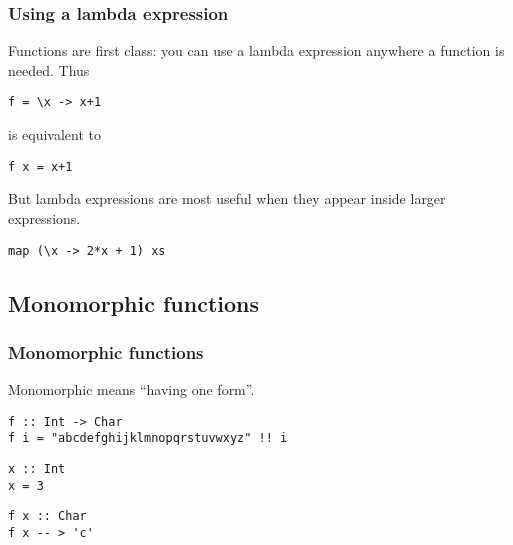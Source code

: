 \documentclass{beamer}
\begin{document}
\begin{frame}[fragile]
\frametitle{Using a lambda expression}

Functions are first class: you can use a lambda expression anywhere
a function is needed.  Thus

\begin{verbatim}
f = \x -> x+1
\end{verbatim}

is equivalent to

\begin{verbatim}
f x = x+1
\end{verbatim}

But lambda expressions are most useful when they appear inside
larger expressions.

\begin{verbatim}
map (\x -> 2*x + 1) xs
\end{verbatim}

\end{frame}

\subsection{Monomorphic functions}

\begin{frame}[fragile]
\frametitle{Monomorphic functions}

Monomorphic means ``having one form''.

\begin{verbatim}
f :: Int -> Char
f i = "abcdefghijklmnopqrstuvwxyz" !! i
\end{verbatim}

\begin{verbatim}
x :: Int
x = 3
\end{verbatim}

\begin{verbatim}
f x :: Char
f x -- > 'c'
\end{verbatim}

\end{frame}

\end{document}
